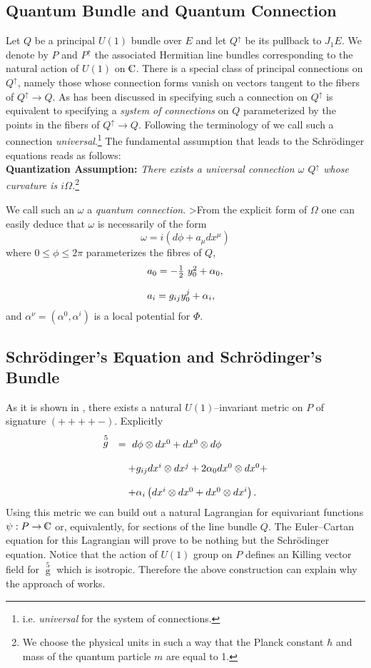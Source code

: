 \documentclass[12pt]{article}
\def\complex{{\kern .1em {\raise .47ex \hbox
{$\scriptscriptstyle
|$}}
\kern -.4em {\rm C}}}
\begin{document}
\subsection{Quantum Bundle and Quantum Connection}

Let $Q$ be a principal $U (1)$ bundle over $E$
and let $Q^{\uparrow}$ be its pullback to $J_{1}E$. 
We denote by $P$ and $P^{\uparrow}$ the associated Hermitian
line bundles corresponding to the natural action of $U (1)$ on 
$\complex$.  There is a special class of principal connections on
$Q^{\uparrow}$,  namely those whose connection forms vanish on
vectors tangent to the fibers of $Q^{\uparrow} \to
 Q$.  As has
been discussed in \cite{mod}
specifying such a connection on
$Q^{\uparrow}$ is equivalent to specifying a {\sl system of
connections} on $Q$ parameterized by the points in the fibers of
$Q^{\uparrow} \to Q$.  Following the terminology of \cite{mod} we
call such a connection {\sl universal}.\footnote{i.e.  {\sl
universal} for the system of connections.}
The fundamental assumption that leads to the Schr\"{o}dinger
equations  reads as follows: 
\\
{\bf Quantization Assumption: }
{\sl There exists a universal connection
$\omega$  $Q^{\uparrow}$ whose curvature is
$i\Omega$.}\footnote{We choose the physical units in such a way
that the Planck constant
$\hbar$ and mass of the quantum particle $m$ are equal to 1. }

We call such an $\omega$ a {\sl quantum connection}. 
>From the explicit
form of $\Omega$ one can easily deduce that $\omega$ is
necessarily of the form
$$
\omega = i\left ( d \phi + a_{\mu} dx^{\mu}\right)
$$
where $0\leq \phi \leq 2\pi$ parameterizes the fibres of $Q$, 
$$
\begin{array}{l}
a_{0} = - {1\over 2} \ y^{2}_{0} + \alpha_{0} ,  \cr\cr
a_{i} =  g_{ij} y^{j}_{0} + \alpha_{i} ,  
\end{array}
$$
and $\alpha^{\nu} = \left (\alpha^{0}, \alpha^{i}\right)$ is a local
potential for $\Phi$. 
\subsection{Schr\"{o}dinger's Equation and Schr\"{o}dinger's Bundle}

As it is shown in \cite{jamo},  there exists a natural $U (1)$--invariant
metric on $P$ of signature $ (++++-)$.  Explicitly 
$$
\begin{array}{ll}
\displaystyle\mathop{g}\limits^{5}
&  =\   d\phi \otimes dx^{0} + dx^{0} \otimes d\phi
\cr\cr
& \quad +g_{ij}dx^{i}\otimes dx^{j} + 2 \alpha_{0}
dx^{0}\otimes  dx^{0} + \cr\cr
& \quad + \alpha_{i}
\left ( dx^{i}\otimes dx^{0} + dx^{0}\otimes dx^{i} \right) . 
\end{array}
$$
Using this metric we can build out a natural Lagrangian for
equivariant functions $\psi :  P \rightarrow \complex$ or, 
equivalently,  for sections of the line bundle $Q$.  The Euler--Cartan
equation for this Lagrangian will prove to be  nothing but the
Schr\"{o}dinger equation.  Notice that the action of $U (1)$ group
on $P$ defines
an Killing vector field for $\mathop{g}\limits^{5}$ which is isotropic.
Therefore the above construction can explain why the
approach of \cite{duv} works.
\end{document}
